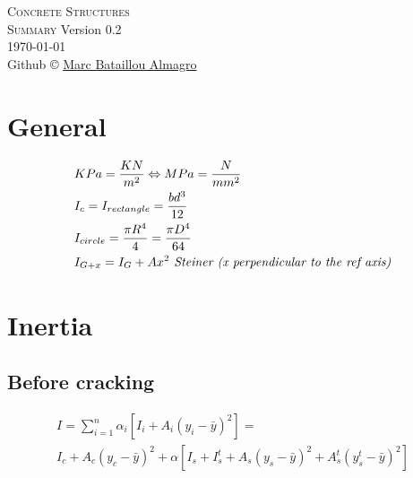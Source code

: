 \documentclass[landscape]{article}
\newcommand{\version}{0.2}
\begin{document}
\thispagestyle{empty}
\begin{center}
  \vspace*{\fill}
  \textsc{\Huge Concrete Structures\\[2ex] \huge Summary}
  \vfill
  \footnotesize{
    Version \version\\[1ex]
    \today\\[1ex]
    Github \copyright{}
    \href{https://github.com/mbataillou?tab=repositories}{Marc Bataillou Almagro}\\
  }
\end{center}
\newpage

\thispagestyle{empty}
\begin{multicols*}{3}
  \tableofcontents
\end{multicols*}
\newpage

\begin{multicols*}{2}

\section{General} %
\label{sec:general}
    $$
      \begin{aligned}
        & KPa = \frac{KN}{m^2} \Leftrightarrow MPa = \frac{N}{mm^2} \\
        & I_c= I_{rectangle} = \frac{bd^3}{12} \\
        & I_{circle}= \frac{\pi R^4}{4}= \frac{\pi D^4}{64}\\
        & I_{G+x} = I_G + Ax^2 \emph{ Steiner (x perpendicular to the ref axis)}
      \end{aligned}\notag
    $$


\section{Inertia} %
\label{sec:inertia}
    \subsection{Before cracking} %
    \label{sub:before_cracking}
    
\begin{multline}
  I = \sum_{i=1}^n \alpha_i\left[I_i + A_i (y_i-\bar{y})^2\right]=\\ I_c + A_c \left(y_c-\bar{y}\right)^2 + \alpha\left[I_s + I_s^t + A_s \left(y_s-\bar{y}\right)^2 + A_s^t (y_s^t-\bar{y})^2\right] 
\end{multline}


\end{multicols*}
\end{document}
